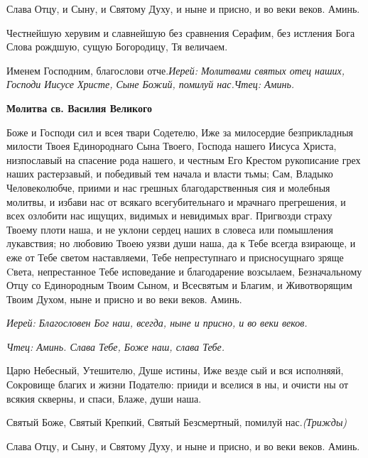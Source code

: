 \normalfont{}Слава Отцу, и Сыну, и Святому Духу, и ныне и присно, и во веки веков. Аминь.

Честнейшую херувим и славнейшую без сравнения Серафим, без истления Бога Слова рождшую, сущую Богородицу, Тя величаем.

Именем Господним, благослови отче.\itshape Иерей\normalfont{}: Молитвами святых отец наших, Господи Иисусе Христе, Сыне Божий, помилуй нас.\itshape Чтец\normalfont{}: Аминь.


\medskip
\bfseries Молитва св. Василия Великого\normalfont{}\nopagebreak

Боже и Господи сил и всея твари Содетелю, Иже за милосердие безприкладныя милости Твоея Единороднаго Сына Твоего, Господа нашего Иисуса Христа, низпославый на спасение рода нашего, и честным Его Крестом рукописание грех наших растерзавый, и победивый тем начала и власти тьмы; Сам, Владыко Человеколюбче, приими и нас грешных благодарственныя сия и молебныя молитвы, и избави нас от всякаго всегубительнаго и мрачнаго прегрешения, и всех озлобити нас ищущих, видимых и невидимых враг. Пригвозди страху Твоему плоти наша, и не уклони сердец наших в словеса или помышления лукавствия; но любовию Твоею уязви души наша, да к Тебе всегда взирающе, и еже от Тебе светом наставляеми, Тебе непреступнаго и присносущнаго зряще Cвета, непрестанное Тебе исповедание и благодарение возсылаем, Безначальному Отцу со Единородным Твоим Сыном, и Всесвятым и Благим, и Животворящим Твоим Духом, ныне и присно и во веки веков. Аминь.

\bigskip\bigskip\mychapterending

 


\itshape Иерей\normalfont{}: Благословен Бог наш, всегда, ныне и присно, и во веки веков.

\itshape Чтец\normalfont{}: Аминь. Слава Тебе, Боже наш, слава Тебе.



Царю Небесный, Утешителю, Душе истины, Иже везде сый и вся исполняяй, Сокровище благих и жизни Подателю: прииди и вселися в ны, и очисти ны от всякия скверны, и спаси, Блаже, души наша.



Святый Боже, Святый Крепкий, Святый Безсмертный, помилуй нас.\itshape  (Трижды)

\normalfont{}Слава Отцу, и Сыну, и Святому Духу, и ныне и присно, и во веки веков. Аминь.



